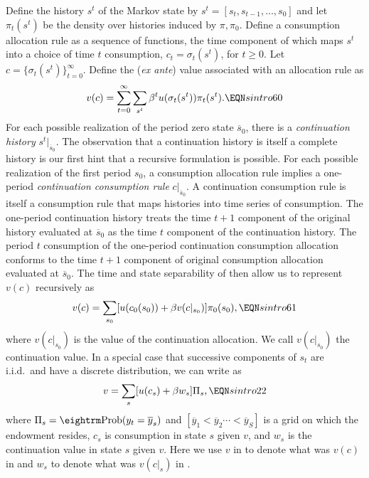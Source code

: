 Define the  history $s^t$ of the Markov state
by $s^t = [s_t, s_{t-1}, \ldots, s_0]$ and let $\pi_t(s^t)$ be the
density over histories induced by $\pi, \pi_0$.
Define a consumption allocation  rule
as a sequence of functions, the time component of which maps
$s^t$ into a choice of time $t$ consumption, $c_t = \sigma_t(s^t)$, for
$t \geq 0$.
Let $c= \{\sigma_t(s^t)\}_{t=0}^\infty$.
Define the ({\it ex ante\/}) value associated with  an allocation
rule as
$$v(c) = \sum_{t=0}^\infty \sum_{s^t} \beta^t u(\sigma_t(s^t)) \pi_t(s^t).
\EQN sintro60 $$
For each possible realization of the period zero state $\overline s_0$,
there is a {\it continuation history\/} $s^t|_{\overline s_0}$.
The observation that a continuation history is itself a complete history
is our first hint that a recursive formulation is
possible.
For each possible realization of the first period $s_0$,
 a consumption allocation rule implies a one-period  {\it continuation
consumption rule\/} $c|_{\overline s_0}$. A continuation consumption
rule is itself a consumption rule that maps histories into
time series of consumption.
 The one-period continuation history
treats the time $t+1$ component of the original history  evaluated
at $\overline s_0$ as the time $t$
component of the continuation history.
 The period $t$  consumption of the
one-period continuation consumption allocation conforms to the
time $t+1$ component of original consumption allocation evaluated
at $\overline s_0$.
The time and state separability of  then allow us to
represent $v(c)$ recursively
as
$$ v(c) = \sum_{s_0} [ u(c_0(s_0) )+ \beta v(c|_{s_0})]\pi_0(s_0) ,
  \EQN sintro61 $$
where $v(c|_{s_0})$ is the value of the continuation allocation.
We call $v(c|_{s_0})$ the continuation value.
In a special case
that successive components of $s_t$ are i.i.d.\ and have a discrete
distribution,
we can write  as
$$ v = \sum_s [u(c_s) + \beta w_s ] \Pi_s, \EQN sintro22 $$
where $\Pi_s = {\rm Prob}(y_t = \overline y_s)$ and
$[\overline y_1 < \overline y_2  \cdots < \overline y_S]$
is a grid on which the endowment resides,
 $c_s$ is
consumption in state $s$ given $v$, and $w_s$ is the continuation
value in state $s$ given $v$.
Here we use $v$ in  to denote what was $v(c)$ in 
and $w_s$ to denote what was $v(c|_s)$ in .

